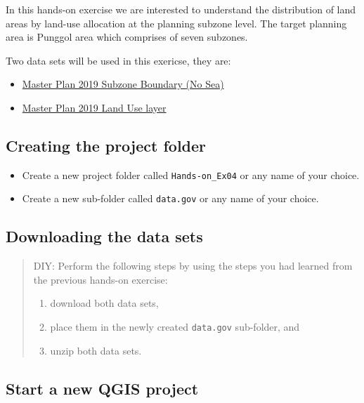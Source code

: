 \documentclass[
  letterpaper,
  DIV=11,
  numbers=noendperiod]{scrreprt}
\begin{document}
In this hands-on exercise we are interested to understand the
distribution of land areas by land-use allocation at the planning
subzone level. The target planning area is Punggol area which comprises
of seven subzones.

Two data sets will be used in this exericse, they are:

\begin{itemize}
\item
  \href{https://data.gov.sg/dataset/master-plan-2019-subzone-boundary-no-sea}{Master
  Plan 2019 Subzone Boundary (No Sea)}
\item
  \href{https://data.gov.sg/dataset/master-plan-2019-land-use-layer}{Master
  Plan 2019 Land Use layer}
\end{itemize}

\hypertarget{creating-the-project-folder}{%
\subsection{Creating the project
folder}\label{creating-the-project-folder}}

\begin{itemize}
\item
  Create a new project folder called \texttt{Hands-on\_Ex04} or any name
  of your choice.
\item
  Create a new sub-folder called \texttt{data.gov} or any name of your
  choice.
\end{itemize}

\hypertarget{downloading-the-data-sets}{%
\subsection{Downloading the data sets}\label{downloading-the-data-sets}}

\begin{quote}
DIY: Perform the following steps by using the steps you had learned from
the previous hands-on exercise:

\begin{enumerate}
\def\labelenumi{(\arabic{enumi})}
\item
  download both data sets,
\item
  place them in the newly created \texttt{data.gov} sub-folder, and
\item
  unzip both data sets.
\end{enumerate}
\end{quote}

\hypertarget{start-a-new-qgis-project}{%
\subsection{Start a new QGIS project}\label{start-a-new-qgis-project}}
\end{document}
